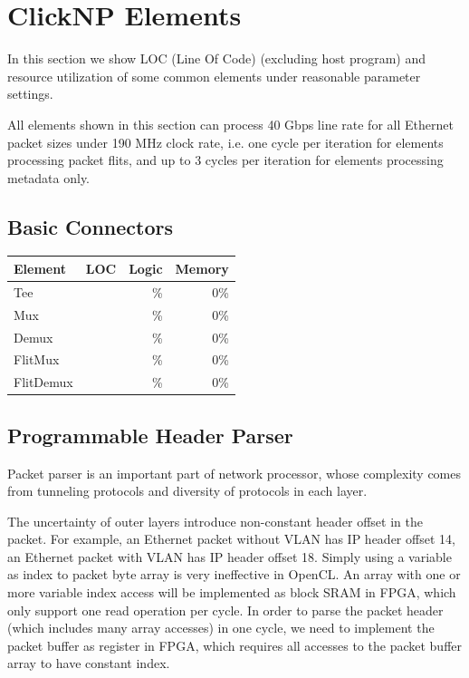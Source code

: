 \section{ClickNP Elements}
\label{clicknp:sec:elements}

In this section we show LOC (Line Of Code) (excluding host program) and resource utilization of some common elements under reasonable parameter settings.

All elements shown in this section can process 40 Gbps line rate for all Ethernet packet sizes under 190 MHz clock rate, i.e. one cycle per iteration for elements processing packet flits, and up to 3 cycles per iteration for elements processing metadata only.

\subsection{Basic Connectors}

\begin{table}[h!]
	\centering
	\label{clicknp:tab:Basic Connectors}
	\begin{tabular}{l|r|r|r}
		Element & LOC & Logic & Memory \\
		\hline
		Tee	&  & \%  & 0\% \\
		Mux	&  & \% & 0\% \\
		Demux & & \% & 0\% \\
		FlitMux & & \% & 0\% \\
		FlitDemux & & \% & 0\% \\
	\end{tabular}
\end{table}


\subsection{Programmable Header Parser}

Packet parser is an important part of network processor, whose complexity comes from tunneling protocols and diversity of protocols in each layer.

The uncertainty of outer layers introduce non-constant header offset in the packet. For example, an Ethernet packet without VLAN has IP header offset 14, an Ethernet packet with VLAN has IP header offset 18. Simply using a variable as index to packet byte array is very ineffective in OpenCL. An array with one or more variable index access will be implemented as block SRAM in FPGA, which only support one read operation per cycle. In order to parse the packet header (which includes many array accesses) in one cycle, we need to implement the packet buffer as register in FPGA, which requires all accesses to the packet buffer array to have constant index.

